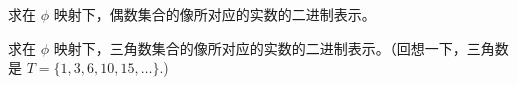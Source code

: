 \begin{exer}
求在 $\phi$ 映射下，偶数集合的像所对应的实数的二进制表示。
\end{exer}

\begin{exer}
求在 $\phi$ 映射下，三角数集合的像所对应的实数的二进制表示。（回想一下，三角数是 $T = \{1,3,6,10,15, \ldots \}$.)
\end{exer}

\newpage





